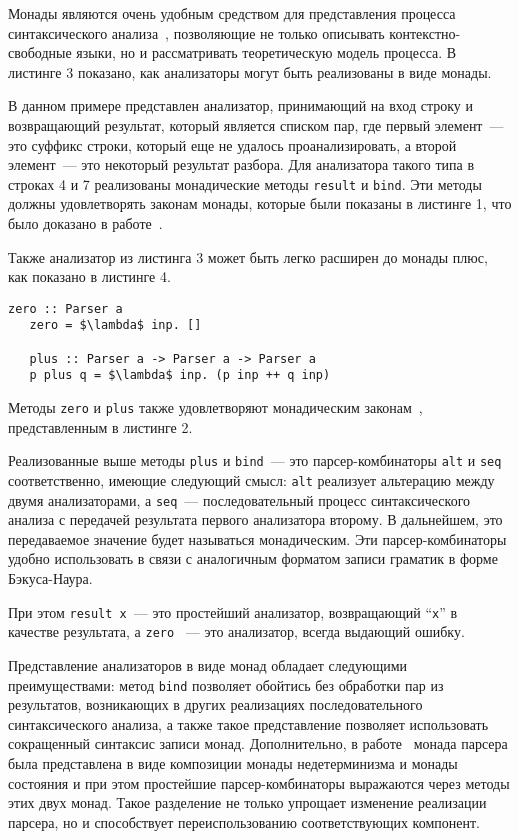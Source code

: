 Монады являются очень удобным средством для представления процесса синтаксического анализа~\cite{meijer}, позволяющие не только описывать контекстно-свободные языки, но и рассматривать теоретическую модель процесса. В листинге 3 показано, как анализаторы могут быть реализованы в виде монады.

В данном примере представлен анализатор, принимающий на вход строку и возвращающий результат, который является списком пар, где первый элемент~--- это суффикс строки, который еще не удалось проанализировать, а второй элемент~--- это некоторый результат разбора. Для анализатора такого типа в строках 4 и 7 реализованы монадические методы \lstinline|result| и \lstinline|bind|. Эти методы должны удовлетворять законам монады, которые были показаны в листинге 1, что было доказано в работе~\cite{wadler}.

Также анализатор из листинга 3 может быть легко расширен до монады плюс, как показано в листинге 4.

\begin{lstlisting}[basicstyle=\small, caption=Парсеры как монады плюс]
   zero :: Parser a
   zero = $\lambda$ inp. []

   plus :: Parser a -> Parser a -> Parser a
   p plus q = $\lambda$ inp. (p inp ++ q inp)
\end{lstlisting}

Методы \lstinline|zero| и \lstinline|plus| также удовлетворяют монадическим законам~\cite{wadler}, представленным в листинге 2.

Реализованные выше методы \lstinline|plus| и \lstinline|bind|~--- это парсер-комбинаторы \lstinline|alt| и \lstinline|seq| соответственно, имеющие следующий смысл: \lstinline|alt| реализует альтерацию между двумя анализаторами, а \lstinline|seq|~--- последовательный процесс синтаксического анализа с передачей результата первого анализатора второму. В дальнейшем, это передаваемое значение будет называться монадическим. Эти парсер-комбинаторы удобно использовать в связи с аналогичным форматом записи граматик в форме Бэкуса-Наура.

При этом \lstinline|result x|~--- это простейший анализатор, возвращающий ``\lstinline|x|'' в качестве результата, а \lstinline|zero| ~--- это анализатор, всегда выдающий ошибку.

Представление анализаторов в виде монад обладает следующими преимуществами: метод \lstinline|bind| позволяет обойтись без обработки пар из результатов, возникающих в других реализациях последовательного синтаксического анализа, а также такое представление позволяет использовать сокращенный синтаксис записи монад. Дополнительно, в работе~\cite{meijer} монада парсера была представлена в виде композиции монады недетерминизма и монады состояния и при этом простейшие парсер-комбинаторы выражаются через методы этих двух монад. Такое разделение не только упрощает изменение реализации парсера, но и способствует переиспользованию соответствующих компонент.

